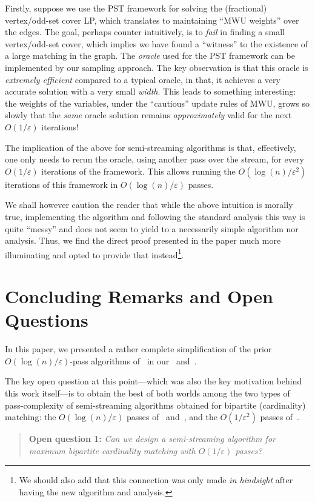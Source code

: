 \documentclass{theoretics}
\newcommand{\eps}{\varepsilon}
\begin{document}
Firstly, suppose we use the PST framework for solving the (fractional) vertex/odd-set cover LP, which translates
to maintaining ``MWU weights'' over the edges. The goal, perhaps counter intuitively, is to \emph{fail} in finding a small vertex/odd-set cover, which implies
we have found a ``witness'' to the existence of a large matching in the graph. The \emph{oracle} used for the PST framework
can be implemented by our sampling approach. The key observation is that this oracle is \emph{extremely efficient} compared to a typical oracle, in that, it achieves a very accurate solution with a very small \emph{width}. This leads
to something interesting: the weights of the variables, under the ``cautious'' update rules of MWU, grows so slowly that the \emph{same} oracle solution remains \emph{approximately} valid for the next $O(1/\eps)$ iterations! 

The implication of the above for semi-streaming algorithms is that, effectively, one only needs to 
rerun the oracle, using another pass over the stream, for every $O(1/\eps)$ iterations of the framework. This allows running the $O(\log{\!(n)}/\eps^2)$ iterations of this framework in $O(\log{\!(n)}/\eps)$ passes. 

We shall however caution the reader that while the above intuition is morally true, implementing the algorithm and following the standard analysis this way is quite ``messy'' and does not seem to yield to a necessarily simple algorithm nor analysis. 
Thus, we find the direct proof presented in the paper much more illuminating and opted to provide that instead\footnote{We should also add that this connection was  only made \emph{in hindsight} after having the new algorithm and analysis.}. 


\section{Concluding Remarks and Open Questions}\label{sec:concluding}

In this paper, we presented a rather complete simplification of the prior $O(\log{\!(n)}/\eps)$-pass algorithms of~\cite{AhnG15} in our~ and~. 

The key open question at this point---which was also the key motivation behind this work itself---is to obtain the best of both worlds among the two types of pass-complexity of semi-streaming algorithms obtained for bipartite (cardinality) matching: the $O(\log{\!(n)}/\eps)$ passes of~\cite{AhnG15,AssadiJJST22} and~, and the $O(1/\eps^2)$ passes of~\cite{AhnG11,AssadiLT21}. 
\begin{quote}
	\textbf{Open question 1:} \emph{Can we design a semi-streaming algorithm for maximum bipartite cardinality matching with $O(1/\eps)$ passes?}
\end{quote}
\end{document}
